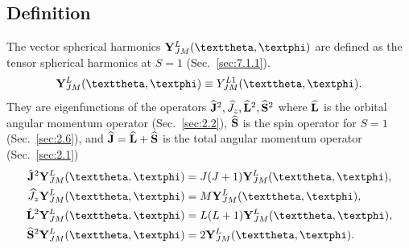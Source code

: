 \subsection{Definition}\label{sec:7.3.1}
The vector spherical harmonics $\vect{Y}_{J M}^{L}(\vartheta, \varphi)$ are defined as the tensor spherical harmonics at $S=1$ (Sec.~\ref{sec:7.1.1}).
\begin{equation}
\vect{Y}_{J M}^{L}(\vartheta, \varphi) \equiv Y_{J M}^{L 1}(\vartheta, \varphi). \label{eq:7:3:1}
\end{equation}
They are eigenfunctions of the operators $\widehat{\mathbf{J}}^{2}, \widehat{J}_{z}, \widehat{\mathbf{L}}^{2}, \widehat{\mathbf{S}}^{2}$ where $\widehat{\mathbf{L}}$ is the orbital angular momentum operator (Sec.~\ref{sec:2.2}), $\widehat{\mathbf{S}}$ is the spin operator for $S=1$ (Sec.~\ref{sec:2.6}), and $\widehat{\mathbf{J}}=\widehat{\mathbf{L}}+\widehat{\mathbf{S}}$ is the total angular momentum operator (Sec.~\ref{sec:2.1})
\begin{align}
\hat{\vect{J}}^{2} \vect{Y}_{J M}^{L}(\vartheta, \varphi) & =J(J+1) \vect{Y}_{J M}^{L}(\vartheta, \varphi), \notag\\
\widehat{J}_{z} \vect{Y}_{J M}^{L}(\vartheta, \varphi) & =M \vect{Y}_{J M}^{L}(\vartheta, \varphi), \notag\\
\hat{\vect{L}}^{2} \vect{Y}_{J M}^{L}(\vartheta, \varphi) & =L(L+1) \vect{Y}_{J M}^{L}(\vartheta, \varphi), \label{eq:7:3:2}\\
\widehat{\vect{S}}^{2} \vect{Y}_{J M}^{L}(\vartheta, \varphi) & =2 \vect{Y}_{J M}^{L}(\vartheta, \varphi) . \notag
\end{align}

